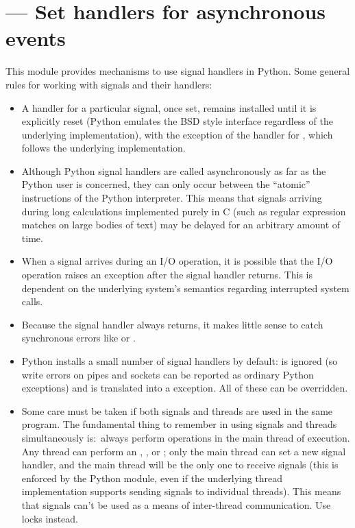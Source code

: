 \section{ ---
         Set handlers for asynchronous events}



This module provides mechanisms to use signal handlers in Python.
Some general rules for working with signals and their handlers:

\begin{itemize}

\item
A handler for a particular signal, once set, remains installed until
it is explicitly reset (Python emulates the BSD style interface
regardless of the underlying implementation), with the exception of
the handler for , which follows the underlying
implementation.

\item
Although Python signal handlers are called asynchronously as far as
the Python user is concerned, they can only occur between the
``atomic'' instructions of the Python interpreter.  This means that
signals arriving during long calculations implemented purely in C
(such as regular expression matches on large bodies of text) may be
delayed for an arbitrary amount of time.

\item
When a signal arrives during an I/O operation, it is possible that the
I/O operation raises an exception after the signal handler returns.
This is dependent on the underlying \UNIX{} system's semantics regarding
interrupted system calls.

\item
Because the \C{} signal handler always returns, it makes little sense to
catch synchronous errors like  or .

\item
Python installs a small number of signal handlers by default:
 is ignored (so write errors on pipes and sockets can be
reported as ordinary Python exceptions) and  is translated
into a  exception.  All of these can be
overridden.

\item
Some care must be taken if both signals and threads are used in the
same program.  The fundamental thing to remember in using signals and
threads simultaneously is:\ always perform  operations
in the main thread of execution.  Any thread can perform an
, , or ;
only the main thread can set a new signal handler, and the main thread
will be the only one to receive signals (this is enforced by the
Python  module, even if the underlying thread
implementation supports sending signals to individual threads).  This
means that signals can't be used as a means of inter-thread
communication.  Use locks instead.

\end{itemize}

